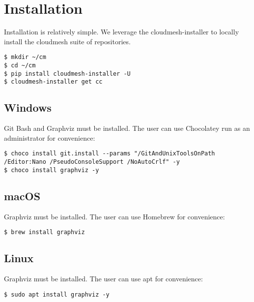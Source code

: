 
\section{Installation}\label{installation}

Installation is relatively simple. We leverage the cloudmesh-installer
to locally install the cloudmesh suite of repositories.

\bigbreak
\begin{verbatim}
$ mkdir ~/cm
$ cd ~/cm
$ pip install cloudmesh-installer -U
$ cloudmesh-installer get cc
\end{verbatim}
\bigbreak

\subsection{Windows}\label{windows}

Git Bash and Graphviz must be installed. The user can use Chocolatey run
as an administrator for convenience:

\bigbreak
\begin{verbatim}
$ choco install git.install --params "/GitAndUnixToolsOnPath /Editor:Nano /PseudoConsoleSupport /NoAutoCrlf" -y
$ choco install graphviz -y
\end{verbatim}
\bigbreak

\subsection{macOS}\label{macos}

Graphviz must be installed. The user can use Homebrew for convenience:

\bigbreak
\begin{verbatim}
$ brew install graphviz
\end{verbatim}
\bigbreak

\hypertarget{linux}{%
\subsection{Linux}\label{linux}}

Graphviz must be installed. The user can use apt for convenience:

\bigbreak
\begin{verbatim}
$ sudo apt install graphviz -y
\end{verbatim}
\bigbreak
